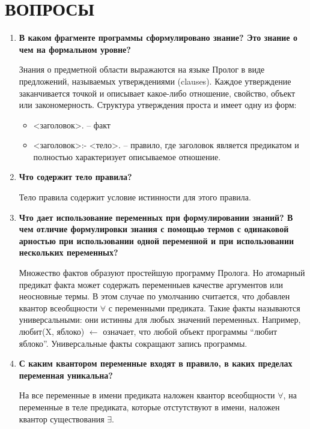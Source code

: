 \section{ВОПРОСЫ}

\begin{enumerate}
    \item \textbf{В каком фрагменте программы сформулировано знание? Это знание о чем на формальном уровне?}

        Знания о предметной области выражаются на языке Пролог в виде предложений, называемых утверждениями (clauses). Каждое утверждение заканчивается точкой и описывает какое-либо отношение, свойство, объект или закономерность. Структура утверждения проста и имеет одну из форм:
        \begin{itemize}
            \item <заголовок>. -- факт
            \item <заголовок>:- <тело>. -- правило, где заголовок является предикатом и полностью характеризует описываемое отношение.
        \end{itemize}

    \item \textbf{Что содержит тело правила?}

        Тело правила содержит условие истинности для этого правила.

    \item \textbf{Что дает использование переменных при формулировании знаний? В чем отличие формулировки знания с помощью термов с одинаковой арностью при использовании одной переменной и при использовании нескольких переменных?}

        Множество фактов образуют простейшую программу Пролога. Но атомарный предикат факта может содержать переменныев качестве аргументов или неосновные термы. В этом случае по умолчанию считается, что добавлен квантор всеобщности $\forall$ с переменными предиката. Такие факты называются универсальными: они истинны для любых значений переменных. Например, любит(X, яблоко) $\leftarrow$ означает, что любой объект программы ``любит яблоко''. Универсальные факты сокращают запись программы.

    \item \textbf{С каким квантором переменные входят в правило, в каких пределах переменная уникальна?}

        На все переменные в имени предиката наложен квантор всеобщности $\forall$, на переменные в теле предиката, которые отстутствуют в имени, наложен квантор существования $\exists$.


\end{enumerate}
